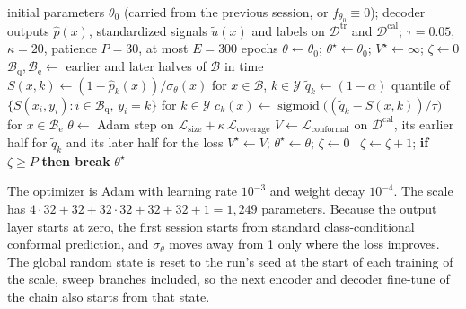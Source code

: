 \documentclass{article}
\begin{document}
\begin{algorithm}[!ht]
  \caption{\textsc{TrainScale}$(\theta_0,\mathcal{D}^{\mathrm{tr}},\mathcal{D}^{\mathrm{cal}},\alpha)$: training the learned scale on one session.}
  \label{alg:scale}
  \begin{algorithmic}[1]
    \Require initial parameters $\theta_0$ (carried from the previous session, or $f_{\theta_0}\equiv0$); decoder outputs $\hat p(x)$, standardized signals $\tilde u(x)$ and labels on $\mathcal{D}^{\mathrm{tr}}$ and $\mathcal{D}^{\mathrm{cal}}$; $\tau=0.05$, $\kappa=20$, patience $P=30$, at most $E=300$ epochs
    \State $\theta\gets\theta_0$; $\theta^\star\gets\theta_0$; $V^\star\gets\infty$; $\zeta\gets0$
        \State $\mathcal{B}_{\mathrm{q}},\mathcal{B}_{\mathrm{e}}\gets$ earlier and later halves of $\mathcal{B}$ in time
        \State $S(x,k)\gets(1-\hat p_k(x))/\sigma_\theta(x)$ for $x\in\mathcal{B}$, $k\in\mathcal{Y}$
        \State $\tilde q_k\gets(1-\alpha)$ quantile of $\{S(x_i,y_i):i\in\mathcal{B}_{\mathrm{q}},\,y_i=k\}$ for $k\in\mathcal{Y}$
        \State $c_k(x)\gets\operatorname{sigmoid}\big((\tilde q_k-S(x,k))/\tau\big)$ for $x\in\mathcal{B}_{\mathrm{e}}$
        \State $\theta\gets$ Adam step on $\mathcal{L}_{\mathrm{size}}+\kappa\,\mathcal{L}_{\mathrm{coverage}}$ 
      \EndFor
      \State $V\gets\mathcal{L}_{\mathrm{conformal}}$ on $\mathcal{D}^{\mathrm{cal}}$, its earlier half for $\tilde q_k$ and its later half for the loss
       $V^\star\gets V$; $\theta^\star\gets\theta$; $\zeta\gets0$
      \Else\ $\zeta\gets \zeta+1$; \textbf{if} $\zeta\ge P$ \textbf{then break}
      \EndIf
    \EndFor
    \State \Return $\theta^\star$
  \end{algorithmic}
\end{algorithm}

The optimizer is Adam with learning rate $10^{-3}$ and weight decay $10^{-4}$. The scale has $4\cdot32+32+32\cdot32+32+32+1=1{,}249$ parameters. Because the output layer starts at zero, the first session starts from standard class-conditional conformal prediction, and $\sigma_\theta$ moves away from 1 only where the loss improves. The global random state is reset to the run's seed at the start of each training of the scale, sweep branches included, so the next encoder and decoder fine-tune of the chain also starts from that state.

\FloatBarrier
\end{document}

